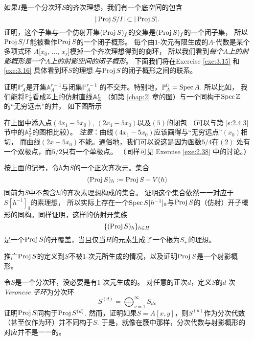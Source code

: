 \begin{exe}\label{exe:3.7}
如果$I$是一个分次环$S$的齐次理想，我们有一个底空间的包含
\[
	|\operatorname{Proj} S/I|\subset |\operatorname{Proj} S|.
\]
证明，这个子集与一个仿射开集$(\operatorname{Proj} S)_f$的交集是$(\operatorname{Proj} S)_f$的一个闭子集，
所以$\operatorname{Proj} S/I$能被看作$\operatorname{Proj} S$的一个闭子概形。
每个由$1$-次元有限生成的$A$-代数是某个多项式环
$A[x_0$, $\dots$, $x_r]$模掉一个齐次理想得到的商环，
所以我们看到\textit{每个$A$上的射影概形是一个$A$上的射影空间的闭子概形}。
下面我们将在Exercise \ref{exe:3.15} 和 \ref{exe:3.16} 具体看到环$S$的理想
与$\operatorname{Proj} S$的闭子概形之间的联系。
\end{exe}

\begin{exe}\label{exe:3.8}
证明$\mathbb P_A^r$是开集$\mathbb A_A^{r-1}$与闭集$\mathbb P_A^{r-1}$
的不交并。特别地，$\mathbb P^0_A=\operatorname{Spec} A$. 所以比如，
我们能将$\mathbb P_{\mathbb Z}^1$看成$\mathbb{Z}$上的仿射直线$\mathbb A_{\mathbb{Z}}^r$
（如第 \ref{chap:2} 章的图）与一个同构于$\operatorname{Spec} \mathbb{Z}$的“无穷远点”的并，
如下图所示

\end{exe}

\begin{exe}\label{exe:3.9}
在上图中添入点$(4x_1-5x_0)$, $(2x_1-5x_0)$以及$(5)$的闭包
（可以与第 \ref{s:2.4.3} 节中的$\mathbb A_{\mathbb Z}^2$的图相比较）。
\textit{注意}：曲线$(4x_1-5x_0)$应该画得与“无穷远点”$(x_0)$相切，
而曲线$(2x-5x_0)$不能。通俗地，我们可以说这是因为函数$5/4$在$(2)$
处有一个双极点，而$5/2$只有一个单极点。
（同样可见 Exercise \ref{exe:2.38} 中的讨论。）
\end{exe}

\begin{exe}\label{exe:3.10}
按上面的记号，令$h$为$S$的一个正次齐次元。集合
\[
	(\operatorname{Proj} S)_h:=\operatorname{Proj} S-V(h)
\]
同前为$S$中不包含$h$的齐次素理想构成的集合。
证明这个集合依然一一对应于$S[h^{-1}]_0$的素理想，
所以实际上存在一个$\operatorname{Spec} S[h^{-1}]_0$与$\operatorname{Proj} S$的（仿射）开子概形的同构。同样证明，这样的仿射开集族
\[
	\{(\operatorname{Proj} S)_h\}_{h\in H}
\]
是一个$\operatorname{Proj} S$的开覆盖，当且仅当$H$的元素生成了一个根为$S_+$的理想。
\end{exe}

\begin{exe}\label{exe:3.11}
推广$\operatorname{Proj} S$的定义到$S$不被$1$-次元所生成的情况，以及证明$\operatorname{Proj} S$是一个射影概形。
\end{exe}

\begin{exe}\label{exe:3.12}
令$S$是一个分次环，没必要是有$1$-次元生成的。
对任意的正次$d$，定义$S$的$d$-次\textit{Veronese 子环}为分次环
\[
	S^{(d)}=\bigoplus_{\nu=1}^\infty S_{d\nu}
\]
证明$\operatorname{Proj} S$同构于$\operatorname{Proj} S^{(d)}$. 
然而，证明如果$S=A[x,y]$，则$S^{(d)}$作为分次代数（甚至仅作为环）并不同构于$S$. 
于是，就像在簇中那样，分次代数与射影概形的对应并不是一一的。
\end{exe}

